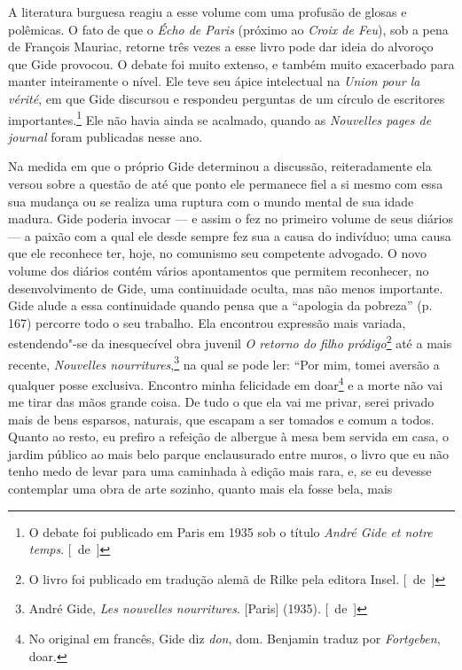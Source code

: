 A literatura burguesa reagiu a esse volume com uma profusão de glosas e
polêmicas. O fato de que o \emph{Écho de Paris} (próximo ao \emph{Croix de Feu}), sob a pena de François Mauriac, retorne três vezes a esse
livro pode dar ideia do alvoroço que Gide provocou. O debate foi muito
extenso, e também muito exacerbado para manter inteiramente o nível. Ele
teve seu ápice intelectual na \emph{Union pour la vérité}, em que Gide
discursou e respondeu perguntas de um círculo de escritores
importantes.\footnote{O debate foi publicado em Paris em 1935 sob o
  título \emph{André Gide et notre temps}. [~de~]} Ele não havia ainda se
acalmado, quando as \emph{Nouvelles pages de journal} foram publicadas
nesse ano.

Na medida em que o próprio Gide determinou a discussão, reiteradamente
ela versou sobre a questão de até que ponto ele permanece fiel a si
mesmo com essa sua mudança ou se realiza uma ruptura com o mundo mental
de sua idade madura. Gide poderia invocar --- e assim o fez no primeiro
volume de seus diários --- a paixão com a qual ele desde sempre fez sua a
causa do indivíduo; uma causa que ele reconhece ter, hoje, no comunismo seu
competente advogado. O novo volume dos diários contém vários apontamentos que
permitem reconhecer, no desenvolvimento de Gide, uma continuidade oculta, mas não menos importante. Gide alude a essa continuidade quando pensa
que a ``apologia da pobreza'' (p. 167) percorre todo o seu trabalho.
Ela encontrou expressão mais variada, estendendo"-se da inesquecível obra
juvenil \emph{O retorno do filho pródigo}\footnote{O livro foi
  publicado em tradução alemã de Rilke pela editora Insel. [~de~]} até a mais recente, \emph{Nouvelles nourritures},\footnote{André Gide,
  \emph{Les nouvelles nourritures}. {[}Paris{]} (1935). [~de~]} na qual
se pode ler: ``Por mim, tomei aversão a qualquer posse exclusiva.
Encontro minha felicidade em doar\footnote{No original em
  francês, Gide diz \emph{don}, dom. Benjamin traduz por \emph{Fortgeben},
  doar. \versal{[N.~T.]}} e a morte não vai me tirar das mãos grande coisa. De tudo o que
ela vai me privar, serei privado mais de bens esparsos, naturais, que
escapam a ser tomados e comum a todos. Quanto ao resto, eu prefiro a
refeição de albergue à mesa bem servida em casa, o jardim público ao
mais belo parque enclausurado entre muros, o livro que eu não tenho medo
de levar para uma caminhada à edição mais rara, e, se eu devesse
contemplar uma obra de arte sozinho, quanto mais ela fosse bela, mais
